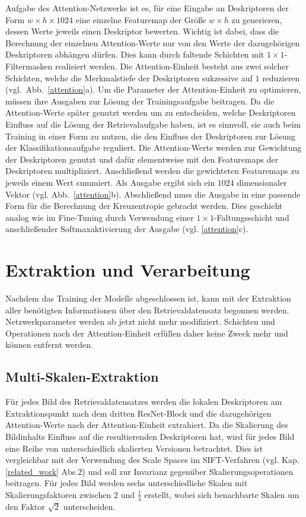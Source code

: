 Aufgabe des Attention-Netzwerks ist es, für eine Eingabe an Deskriptoren der Form $w\times h\times 1024$ eine einzelne Featuremap der Größe $w\times h$ zu generieren, dessen Werte jeweils einen Deskriptor bewerten. Wichtig ist dabei, dass die Berechnung der einzelnen Attention-Werte nur von den Werte der dazugehörigen Deskriptoren abhängen dürfen. Dies kann durch faltende Schichten mit $1\times1$-Filtermasken realisiert werden. Die Attention-Einheit besteht aus zwei solcher Schichten, welche die Merkmalstiefe der Deskriptoren sukzessive auf $1$ reduzieren \mbox{(vgl. Abb.~\ref{attention}a).}  
Um die Parameter der Attention-Einheit zu optimieren, müssen ihre Ausgaben zur Lösung der Trainingsaufgabe beitragen. Da die Attention-Werte später genutzt werden um zu entscheiden, welche Deskriptoren Einfluss auf die Lösung der Retrievalaufgabe haben, ist es sinnvoll, sie auch beim Training in einer Form zu nutzen, die den Einfluss der Deskriptoren zur Lösung der Klassifikationsaufgabe reguliert. Die Attention-Werte werden zur Gewichtung der Deskriptoren genutzt und dafür elementweise mit den Featuremaps der Deskriptoren multipliziert. Anschließend werden die gewichteten Featuremaps zu jeweils einem Wert summiert. Als Ausgabe ergibt sich ein $1024$ dimensionaler Vektor (vgl. Abb.~\ref{attention}b). Abschließend muss die Ausgabe in eine passende Form für die Berechnung der Kreuzentropie gebracht werden. Dies geschieht analog wie im Fine-Tuning durch Verwendung einer $1\times1$-Faltungsschicht und anschließender Softmaxaktivierung der Ausgabe (vgl. \ref{attention}c).


\section{Extraktion und Verarbeitung}

Nachdem das Training der Modelle abgeschlossen ist, kann mit der Extraktion aller benötigten Informationen über den Retrievaldatensatz begonnen werden. Netzwerkparameter werden ab jetzt nicht mehr modifiziert. Schichten und Operationen nach der Attention-Einheit erfüllen daher keine Zweck mehr und können entfernt werden.
\subsection{Multi-Skalen-Extraktion}
Für jedes Bild des Retrievaldatensatzes werden die lokalen Deskriptoren am Extraktionspunkt nach dem dritten ResNet-Block und die dazugehörigen Attention-Werte nach der Attention-Einheit extrahiert. Da die Skalierung des Bildinhalts Einfluss auf die resultierenden Deskriptoren hat, wird für jedes Bild eine Reihe von unterschiedlich skalierten Versionen betrachtet. Dies ist vergleichbar mit der Verwendung des Scale Spaces im SIFT-Verfahren (vgl. Kap.\ref{related_work} Abs.2) und soll zur Invarianz gegenüber Skalierungsoperationen beitragen. Für jedes Bild werden sechs unterschiedliche Skalen mit Skalierungsfaktoren zwischen $2$ und $\frac{1}{4}$ erstellt, wobei sich benachbarte Skalen um den Faktor $\sqrt{2}$ unterscheiden. 
